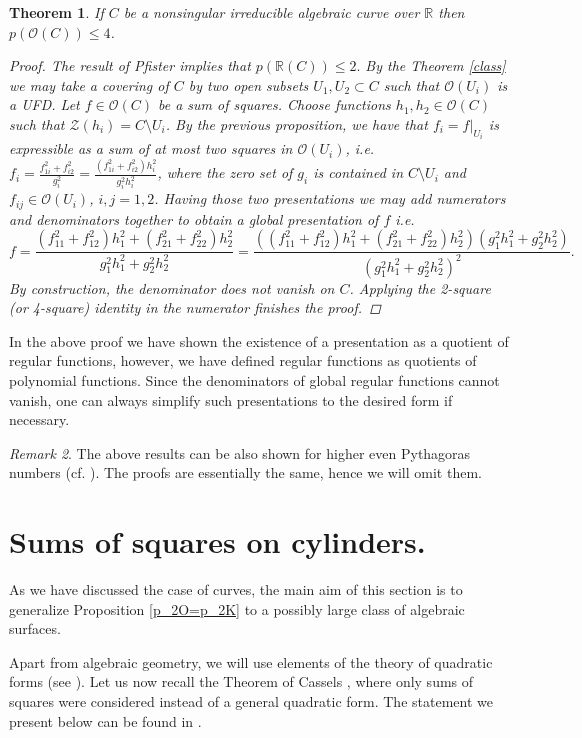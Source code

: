 \documentclass[12pt,reqno]{amsart}   	%
\newtheorem{thm}{Theorem}[section]
\theoremstyle{obs}
\theoremstyle{prob}
\theoremstyle{conj}
\theoremstyle{remark}
\newtheorem{remark}[thm]{Remark}
\newcommand{\R}{\mathbb{R}}
\newcommand{\OO}{\mathcal{O}}
\begin{document}
\begin{thm}\label{p_2(OO(C))}
If $C$ be a nonsingular irreducible algebraic curve over $\R$ then $p(\OO(C)) \leq 4$.

\begin{proof}
The result of Pfister \cite[Corollary 3.4]{pfister1995} implies that $p(\R(C)) \leq 2.$ By the Theorem \ref{class} we may take a covering of $C$ by two open subsets $U_1,U_2 \subset C$ such that $\OO(U_i)$ is a UFD. Let $f \in \OO(C)$ be a sum of squares. Choose functions $h_1,h_2 \in \OO(C)$ such that $\mathcal{Z}(h_i)=C\setminus U_i$.
By the previous proposition, we have that $f_i=f|_{U_i}$ is expressible as a sum of at most two squares in $\OO(U_i)$, i.e. $f_i= \frac{f_{1i}^2+f_{i2}^2}{g_i^2}= \frac{(f_{1i}^2+f_{i2}^2)h_i^2}{g_i^2h_i^2}$, where the zero set of $g_i$ is contained in $C \setminus U_i$ and $f_{ij}\in \OO(U_i)$, $i,j=1,2$. Having those two presentations we may add numerators and denominators together to obtain a global presentation of $f$ i.e.
$$f=\frac{(f_{11}^2+f_{12}^2)h_1^2+(f_{21}^2+f_{22}^2)h_2^2}{g_1^2h_1^2+g_2^2h_2^2}=\frac{\left((f_{11}^2+f_{12}^2)h_1^2+(f_{21}^2+f_{22}^2)h_2^2 \right)(g_1^2h_1^2+g_2^2h_2^2)}{(g_1^2h_1^2+g_2^2h_2^2)^2}.$$ By construction, the denominator does not vanish on $C$. Applying the 2-square (or 4-square) identity in the numerator finishes the proof.
\end{proof}
\end{thm}
In the above proof we have shown the existence of a presentation as a quotient of regular functions, however, we have defined regular functions as quotients of polynomial functions. Since the denominators of global regular functions cannot vanish, one can always simplify such presentations to the desired form if necessary.
\begin{remark}
The above results can be also shown for higher even Pythagoras numbers (cf. \cite{kv2023}). The proofs are essentially the same, hence we will omit them.
\end{remark}


\section{Sums of squares on cylinders.}
As we have discussed the case of curves, the main aim of this section is to generalize Proposition \ref{p_2O=p_2K} to a possibly large class of algebraic surfaces.

Apart from algebraic geometry, we will use elements of the theory of quadratic forms (see \cite{pfister1995}). Let us now recall the Theorem of Cassels \cite{cassels1964}, where only sums of squares were considered instead of a general quadratic form. The statement we present below can be found  in \cite[Chapter 1, Theorem 2.2]{pfister1995}.
\end{document}
